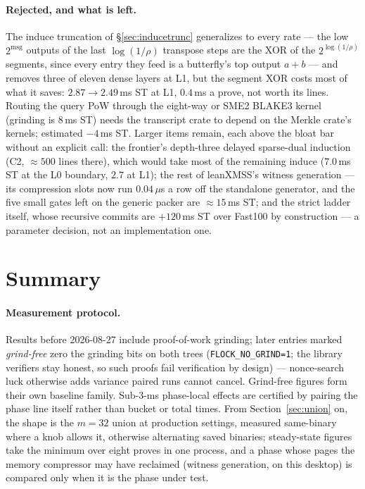 \documentclass[11pt]{article}
\newcommand{\code}[1]{\texttt{#1}}
\begin{document}
\paragraph{Rejected, and what is left.} The induce truncation of
\S\ref{sec:inducetrunc} generalizes to every rate --- the low
$2^{\mathrm{msg}}$ outputs of the last $\log(1/\rho)$ transpose steps are
the XOR of the $2^{\log(1/\rho)}$ segments, since every entry they feed is
a butterfly's top output $a+b$ --- and removes three of eleven dense layers
at L1, but the segment XOR costs most of what it saves: $2.87\to2.49\,$ms
ST at L1, $0.4\,$ms a prove, not worth its lines. Routing the query PoW
through the eight-way or SME2 BLAKE3 kernel (grinding is $8\,$ms ST) needs
the transcript crate to depend on the Merkle crate's kernels; estimated
$-4\,$ms ST. Larger items remain, each above the bloat bar without
an explicit call: the frontier's depth-three delayed sparse-dual
induction (C2, $\approx500$ lines there), which would take most of the
remaining induce ($7.0\,$ms ST at the L0 boundary, $2.7$ at L1); the
rest of leanXMSS's witness generation --- its compression slots now run
$0.04\,\mu$s a row off the standalone generator, and the five small gates
left on the generic packer are $\approx15\,$ms ST; and the
strict ladder itself, whose recursive commits are
$+120\,$ms ST over Fast100 by construction --- a parameter decision, not
an implementation one.

\section*{Summary}

\paragraph{Measurement protocol.} Results before 2026-08-27 include
proof-of-work grinding; later entries marked \emph{grind-free} zero the
grinding bits on both trees (\code{FLOCK\_NO\_GRIND=1}; the library
verifiers stay honest, so such proofs fail verification by design) —
nonce-search luck otherwise adds variance paired runs cannot cancel.
Grind-free figures form their own baseline family. Sub-3-ms phase-local
effects are certified by pairing the phase line itself rather than
bucket or total times. From Section~\ref{sec:union} on, the shape is
the $m{=}32$ union at production settings, measured same-binary where a
knob allows it, otherwise alternating saved binaries; steady-state
figures take the minimum over eight proves in one process, and a phase
whose pages the memory compressor may have reclaimed (witness
generation, on this desktop) is compared only when it is the phase
under test.
\end{document}
